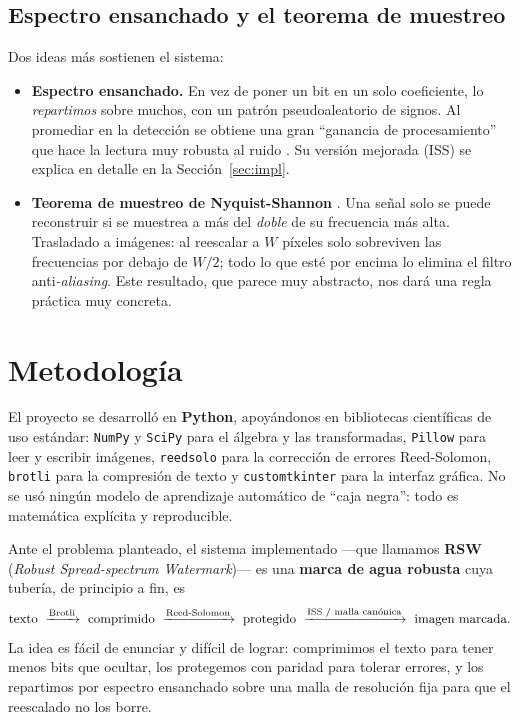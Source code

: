 \documentclass[12pt,a4paper]{article}
\renewcommand{\nobreakdash}{}
\begin{document}
\subsection{Espectro ensanchado y el teorema de muestreo}

Dos ideas más sostienen el sistema:
\begin{itemize}[leftmargin=1.6em]
\item \textbf{Espectro ensanchado.} En vez de poner un bit en un solo coeficiente, lo
\emph{repartimos} sobre muchos, con un patrón pseudoaleatorio de signos. Al promediar en la
detección se obtiene una gran ``ganancia de procesamiento'' que hace la lectura muy robusta
al ruido \cite{cox1997}. Su versión mejorada (ISS) \cite{malvar2003} se explica en detalle
en la Sección~\ref{sec:impl}.
\item \textbf{Teorema de muestreo de Nyquist\nobreakdash-Shannon}
\cite{nyquist1928,shannon1949}. Una señal solo se puede reconstruir si se muestrea a más
del \emph{doble} de su frecuencia más alta. Trasladado a imágenes: al reescalar a $W$
píxeles solo sobreviven las frecuencias por debajo de $W/2$; todo lo que esté por encima lo
elimina el filtro anti\emph{-aliasing}. Este resultado, que parece muy abstracto, nos dará
una regla práctica muy concreta.
\end{itemize}

\section{Metodología}

El proyecto se desarrolló en \textbf{Python}, apoyándonos en bibliotecas científicas de
uso estándar: \texttt{NumPy} y \texttt{SciPy} para el álgebra y las transformadas,
\texttt{Pillow} para leer y escribir imágenes, \texttt{reedsolo} para la corrección de
errores Reed\nobreakdash-Solomon, \texttt{brotli} para la compresión de texto y
\texttt{customtkinter} para la interfaz gráfica. No se usó ningún modelo de aprendizaje
automático de ``caja negra'': todo es matemática explícita y reproducible.

Ante el problema planteado, el sistema implementado ---que llamamos \textbf{RSW}
(\emph{Robust Spread-spectrum Watermark})--- es una \textbf{marca de agua robusta}
cuya tubería, de principio a fin, es
\[
\text{texto}\ \xrightarrow{\text{Brotli}}\ \text{comprimido}\
\xrightarrow{\text{Reed\text{-}Solomon}}\ \text{protegido}\
\xrightarrow{\text{ISS / malla canónica}}\ \text{imagen marcada}.
\]
La idea es fácil de enunciar y difícil de lograr: comprimimos el texto para tener menos bits
que ocultar, los protegemos con paridad para tolerar errores, y los repartimos por espectro
ensanchado sobre una malla de resolución fija para que el reescalado no los borre.
\end{document}
